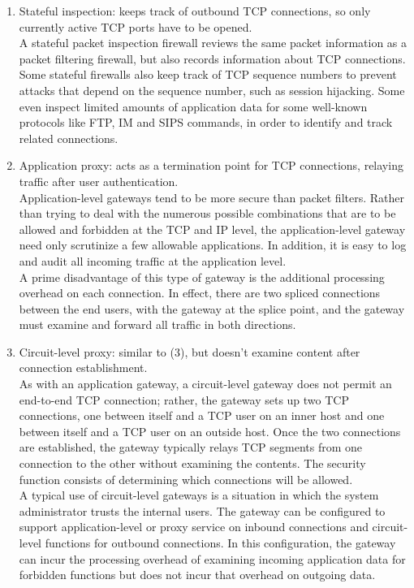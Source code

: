 \documentclass[12pt]{article}
\begin{document}
\begin{enumerate}
 	\item Stateful inspection: keeps track of outbound TCP connections, so only currently active TCP ports have to be opened.\\
 	A stateful packet inspection firewall reviews the same packet information as a packet filtering firewall, but also records information about TCP connections. Some stateful firewalls also keep track of TCP sequence numbers to prevent attacks that depend on the sequence number, such as session hijacking. Some even inspect limited amounts of application data for some well-known protocols like FTP, IM and SIPS commands, in order to identify and track related connections.
 	\item Application proxy: acts as a termination point for TCP connections, relaying traffic after user authentication.\\
 	Application-level gateways tend to be more secure than packet filters. Rather than trying to deal with the numerous possible combinations that are to be allowed and forbidden at the TCP and IP level, the application-level gateway need only scrutinize a few allowable applications. In addition, it is easy to log and audit all incoming traffic at the application level.\\
 	A prime disadvantage of this type of gateway is the additional processing overhead on each connection. In effect, there are two spliced connections between the end users, with the gateway at the splice point, and the gateway must examine and forward all traffic in both directions.
 	\item Circuit-level proxy: similar to (3), but doesn't examine content after connection establishment.\\
 	As with an application gateway, a circuit-level gateway does not permit an end-to-end TCP connection; rather, the gateway sets up two TCP connections, one between itself and a TCP user on an inner host and one between itself and a TCP user on an outside host. Once the two connections are established, the gateway typically relays TCP segments from one connection to the other without examining the contents. The security function consists of determining which connections will be allowed.\\
 	A typical use of circuit-level gateways is a situation in which the system administrator trusts the internal users. The gateway can be configured to support application-level or proxy service on inbound connections and circuit-level functions for outbound connections. In this configuration, the gateway can incur the processing overhead of examining incoming application data for forbidden functions but does not incur that overhead on outgoing data.
 \end{enumerate}
 
\end{document}
